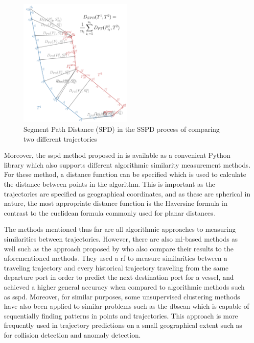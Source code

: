 \begin{figure}[htbp]  %
    \centering
    \includegraphics[width=0.5\textwidth]{figures/sspd}
    \caption{Segment Path Distance (SPD) in the SSPD process of comparing two different trajectories \parencite{besse2015review}}
    \label{fig:sspd}
\end{figure}

Moreover, the \acrshort{sspd} method proposed in \cite{besse2015review} is available as a convenient Python library which also supports different algorithmic similarity measurement methods. For these method, a distance function can be specified which is used to calculate the distance between points in the algorithm. This is important as the trajectories are specified as geographical coordinates, and as these are spherical in nature, the most appropriate distance function is the Haversine \parencite{haversine} formula in contrast to the euclidean formula commonly used for planar distances.

The methods mentioned thus far are all algorithmic approaches to measuring similarities between trajectories. However, there are also \acrshort{ml}-based methods as well such as the approach proposed by \cite{Zhang2020AISApproach} who also compare their results to the aforementioned methods. They used a \acrfull{rf} to measure similarities between a traveling trajectory and every historical trajectory traveling from the same departure port in order to predict the next destination port for a vessel, and achieved a higher general accuracy when compared to algorithmic methods such as \acrshort{sspd}. Moreover, for similar purposes, some unsupervised clustering methods have also been applied to similar problems such as the \acrfull{dbscan} which is capable of sequentially finding patterns in points and trajectories. This approach is more frequently used in trajectory predictions on a small geographical extent such as for collision detection and anomaly detection.

